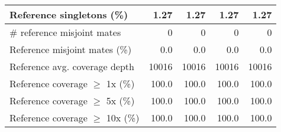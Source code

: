 \documentclass[12pt,a4paper]{article}
\begin{document}
\begin{table}[ht]
\begin{center}
\begin{tabular}{|l*{4}{|r}|}
Reference singletons (\%) & 1.27 & 1.27 & 1.27 & 1.27 \\ \hline
\# reference misjoint mates & 0 & 0 & 0 & 0 \\ \hline
Reference misjoint mates (\%) & 0.0 & 0.0 & 0.0 & 0.0 \\ \hline
Reference avg. coverage depth & 10016 & 10016 & 10016 & 10016 \\ \hline
Reference coverage $\geq$ 1x (\%) & 100.0 & 100.0 & 100.0 & 100.0 \\ \hline
Reference coverage $\geq$ 5x (\%) & 100.0 & 100.0 & 100.0 & 100.0 \\ \hline
Reference coverage $\geq$ 10x (\%) & 100.0 & 100.0 & 100.0 & 100.0 \\ \hline
\end{tabular}
\end{center}
\end{table}
\end{document}
